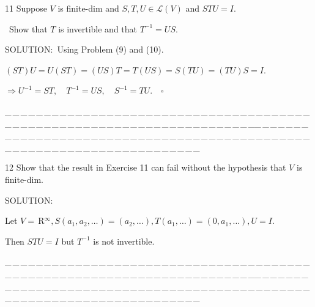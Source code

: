 \documentclass[a4paper, 11pt, UTF8]{article}
\def\Lm{\mathcal{L}}
\def\Rbfc{$\,{\timesbf R}$}
\begin{document}
\begin{large}
{\timesbf\Large 11} {\timessl\Large 
Suppose $V$ is finite-dim and $S, T, U\in\Lm(V)$ and $STU = I$.}\par\quad\,
{\timessl\Large Show that $T$ is invertible and that $T^{-1} = US$.
}\par
{\timesbf S\footnotesize{OLUTION:}}\,\,\,Using Problem (9) and (10).\par\quad
$(ST)U=U(ST)=(US)T=T(US)=S(TU)=(TU)S=I.$\par\quad
$\Rightarrow U^{-1}=ST,\quad T^{-1}=US,\quad S^{-1}=TU.\quad\square$\par
{\tiny \_\,\_\,\_\,\_\,\_\,\_\,\_\,\_\,\_\,\_\,\_\,\_\,\_\,\_\,\_\,\_\,\_\,\_\,\_\,\_\,\_\,\_\,\_\,\_\,\_\,\_\,\_\,\_\,\_\,\_\,\_\,\_\,\_\,\_\,\_\,\_\,\_\,\_\,\_\,\_\,\_\,\_\,\_\,\_\,\_\,\_\,\_\,\_\,\_\,\_\,\_\,\_\,\_\,\_\,\_\,\_\,\_\,\_\,\_\,\_\,\_\,\_\,\_\,\_\,\_\,\_\,\_\,\_\,\_\,\_\,\_\_\,\_\,\_\,\_\,\_\,\_\,\_\,\_\,\_\,\_\,\_\,\_\,\_\,\_\,\_\,\_\,\_\,\_\,\_\,\_\,\_\,\_\,\_\,\_\,\_\,\_\,\_\,\_\,\_\,\_\,\_\,\_\,\_\,\_\,\_\,\_\,\_\,\_\,\_\,\_\,\_\,\_\,\_\,\_\,\_\,\_\,\_\,\_\,\_\,\_\,\_\,\_\,\_\,\_\,\_\,\_\,\_\,\_\,\_\,\_\,\_\,\_\,\_\,\_\,\_\,\_\,\_\,\_\,\_\,\_\,\_}\par

{\timesbf\Large 12} {\timessl\Large 
Show that the result in Exercise 11 can fail without the hypothesis that $V$ is finite-dim.
}\par
{\timesbf S\footnotesize{OLUTION:}}\par\quad
Let $V=\Rbfc^\infty,S(a_1,a_2,\dots)=(a_2,\dots),T(a_1,\dots)=(0,a_1,\dots),U=I.$\par\quad
Then $STU=I$ but $T^{-1}$ is not invertible.
\par
{\tiny \_\,\_\,\_\,\_\,\_\,\_\,\_\,\_\,\_\,\_\,\_\,\_\,\_\,\_\,\_\,\_\,\_\,\_\,\_\,\_\,\_\,\_\,\_\,\_\,\_\,\_\,\_\,\_\,\_\,\_\,\_\,\_\,\_\,\_\,\_\,\_\,\_\,\_\,\_\,\_\,\_\,\_\,\_\,\_\,\_\,\_\,\_\,\_\,\_\,\_\,\_\,\_\,\_\,\_\,\_\,\_\,\_\,\_\,\_\,\_\,\_\,\_\,\_\,\_\,\_\,\_\,\_\,\_\,\_\,\_\,\_\_\,\_\,\_\,\_\,\_\,\_\,\_\,\_\,\_\,\_\,\_\,\_\,\_\,\_\,\_\,\_\,\_\,\_\,\_\,\_\,\_\,\_\,\_\,\_\,\_\,\_\,\_\,\_\,\_\,\_\,\_\,\_\,\_\,\_\,\_\,\_\,\_\,\_\,\_\,\_\,\_\,\_\,\_\,\_\,\_\,\_\,\_\,\_\,\_\,\_\,\_\,\_\,\_\,\_\,\_\,\_\,\_\,\_\,\_\,\_\,\_\,\_\,\_\,\_\,\_\,\_\,\_\,\_\,\_\,\_\,\_}\par


\end{large}
\end{document}
